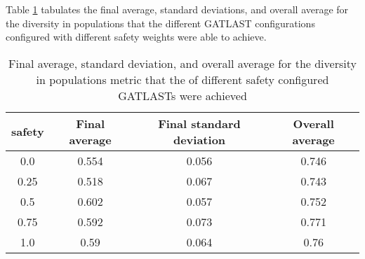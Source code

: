 Table \ref{tab:HP:GA:Safety:diversity in populations} tabulates the final average, standard deviations, and overall average for the diversity in populations that the different GATLAST configurations configured with different safety weights were able to achieve.
\begin{table}[tbh!]
\centering
\begin{adjustbox}{trim=0cm 0cm 0cm 0cm, clip=true}
\begin{tabular}{|c|c|c|c|}
\hline
safety & Final average & Final standard deviation & Overall average\\
\hline
0.0 & 0.554 & 0.056 & 0.746\\\hline
0.25 & 0.518 & 0.067 & 0.743\\\hline
0.5 & 0.602 & 0.057 & 0.752\\\hline
0.75 & 0.592 & 0.073 & 0.771\\\hline
1.0 & 0.59 & 0.064 & 0.76\\\hline
\end{tabular}
\end{adjustbox}
\caption{Final average, standard deviation, and overall average for the diversity in populations metric that the of different safety configured GATLASTs were achieved}
\label{tab:HP:GA:Safety:diversity in populations}
\end{table}